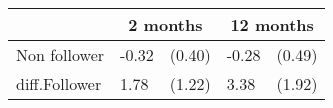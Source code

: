 {
\def\sym#1{\ifmmode^{#1}\else\(^{#1}\)\fi}
\begin{tabular*}{.65\hsize}{@{\hskip\tabcolsep\extracolsep\fill}l*{2}{lc}}
\toprule
                &\multicolumn{2}{c}{2 months}&\multicolumn{2}{c}{12 months}\\
\midrule
Non follower    &    -0.32         &   (0.40)&    -0.28         &   (0.49)\\
diff.Follower   &     1.78         &   (1.22)&     3.38         &   (1.92)\\
\bottomrule
\end{tabular*}
}
